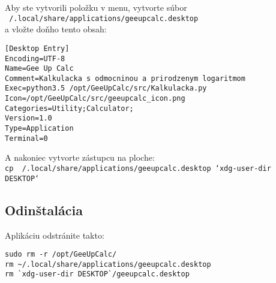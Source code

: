 \documentclass[12pt, a4paper]{article}
\begin{document}
Aby ste vytvorili položku v menu, vytvorte súbor \\
\texttt{~/.local/share/applications/geeupcalc.desktop} \\
a vložte doňho tento obsah:

\begin{verbatim}
[Desktop Entry]
Encoding=UTF-8
Name=Gee Up Calc
Comment=Kalkulacka s odmocninou a prirodzenym logaritmom
Exec=python3.5 /opt/GeeUpCalc/src/Kalkulacka.py
Icon=/opt/GeeUpCalc/src/geeupcalc_icon.png
Categories=Utility;Calculator;
Version=1.0
Type=Application
Terminal=0
\end{verbatim}

A nakoniec vytvorte zástupcu na ploche: \\
\texttt{cp ~/.local/share/applications/geeupcalc.desktop `xdg-user-dir DESKTOP`}

\subsection{Odinštalácia}

Aplikáciu odstránite takto:
\begin{verbatim}
sudo rm -r /opt/GeeUpCalc/
rm ~/.local/share/applications/geeupcalc.desktop
rm `xdg-user-dir DESKTOP`/geeupcalc.desktop
\end{verbatim}
\end{document}
